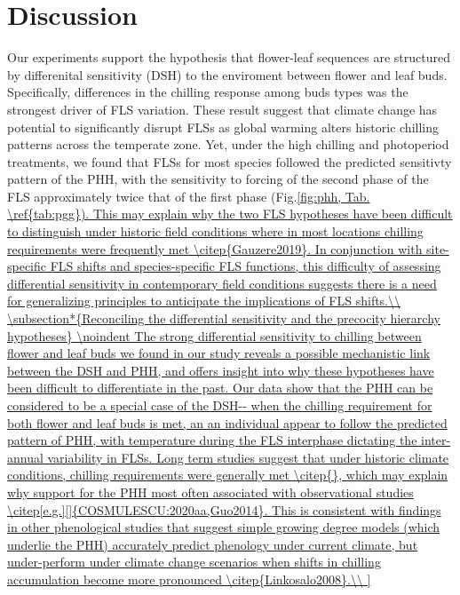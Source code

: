 \documentclass[11pt]{article}\usepackage[]{graphicx}\usepackage[]{color}
\begin{document}
\section*{Discussion}
\noindent Our experiments support the hypothesis that flower-leaf sequences are structured by differenital sensitivity (DSH) to the enviroment between flower and leaf buds. Specifically, differences in the chilling response among buds types was the strongest driver of FLS variation. These result suggest that climate change has potential to significantly disrupt FLSs as global warming alters historic chilling patterns across the temperate zone. %
Yet, under the high chilling and photoperiod treatments, we found that FLSs for most species followed the predicted sensitivty pattern of the PHH, with the sensitivity to forcing of the second phase of the FLS approximately twice that of the first phase (Fig.\ref{fig:phh, Tab. \ref{tab:pgg}). This may explain why the two FLS hypotheses have been difficult to distinguish under historic field conditions where in most locations chilling requirements were frequently met \citep{Gauzere2019}. In conjunction with site-specific FLS shifts and species-specific FLS functions, this difficulty of assessing differential sensitivity in contemporary field conditions suggests there is a need for generalizing principles to  anticipate the implications of FLS shifts.\\

\subsection*{Reconciling the differential sensitivity and the precocity hierarchy hypotheses}

\noindent The strong differential sensitivity to chilling between flower and leaf buds we found in our study reveals a possible mechanistic link between the DSH and PHH, and offers insight into why these hypotheses have been difficult to differentiate in the past. Our data show that the PHH can be considered to be a special case of the DSH-- when the chilling requirement for both flower and leaf buds is met, an an individual appear to follow the predicted pattern of PHH, with temperature during the FLS interphase dictating the inter-annual variability in FLSs. Long term studies suggest that under historic climate conditions, chilling requirements were generally met \citep{}, which may explain why support for the PHH most often associated with observational studies \citep[e.g.][]{COSMULESCU:2020aa,Guo2014}. This is consistent with findings in other phenological studies that suggest simple growing degree models (which underlie the PHH) accurately predict phenology under current climate, but under-perform under climate change scenarios when shifts in chilling accumulation become more pronounced \citep{Linkosalo2008}.\\ 

}
\end{document}
